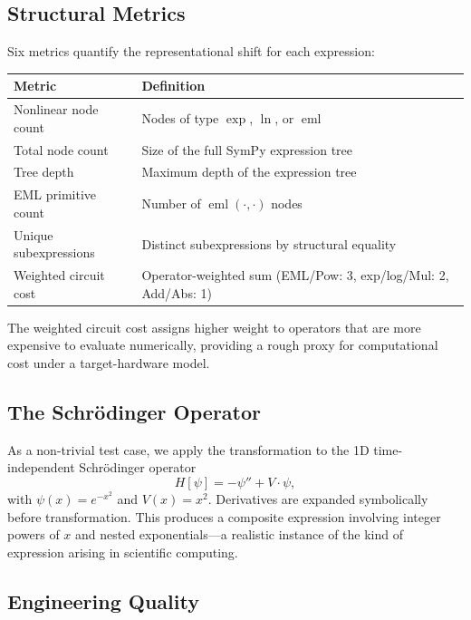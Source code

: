 \documentclass[11pt,a4paper]{article}
\newcommand{\eml}{\operatorname{eml}}
\newcommand{\expf}{\operatorname{exp}}
\newcommand{\lnf}{\operatorname{ln}}
\begin{document}
\subsection{Structural Metrics}

Six metrics quantify the representational shift for each expression:

\begin{center}
\small
\begin{tabular}{ll}
\toprule
\textbf{Metric} & \textbf{Definition} \\
\midrule
Nonlinear node count  & Nodes of type $\expf$, $\lnf$, or $\eml$ \\
Total node count      & Size of the full SymPy expression tree \\
Tree depth            & Maximum depth of the expression tree \\
EML primitive count   & Number of $\eml(\cdot,\cdot)$ nodes \\
Unique subexpressions & Distinct subexpressions by structural equality \\
Weighted circuit cost & Operator-weighted sum (EML/Pow: 3, exp/log/Mul: 2, Add/Abs: 1) \\
\bottomrule
\end{tabular}
\end{center}

The weighted circuit cost assigns higher weight to operators that are
more expensive to evaluate numerically, providing a rough proxy for
computational cost under a target-hardware model.

\subsection{The Schrödinger Operator}

As a non-trivial test case, we apply the transformation to the
1D time-independent Schrödinger operator
\begin{equation}
  H[\psi] = -\psi'' + V \cdot \psi,
\end{equation}
with $\psi(x) = e^{-x^2}$ and $V(x) = x^2$. Derivatives are expanded
symbolically before transformation. This produces a composite expression
involving integer powers of $x$ and nested exponentials---a realistic
instance of the kind of expression arising in scientific computing.

\subsection{Engineering Quality}
\end{document}
